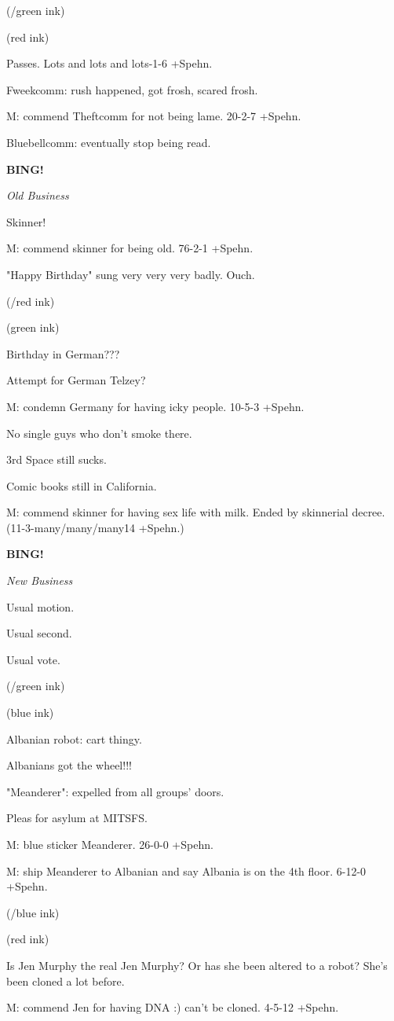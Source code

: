 \documentclass[12pt]{article}
\newcommand{\bing}{{\bf BING!} }
\newcommand{\goto}[1]{\bing \vskip 12pt \centerline{{\em{#1}}}}
\begin{document}
(/green ink)

(red ink)

Passes. Lots and lots and lots-1-6 +Spehn.

Fweekcomm: rush happened, got frosh, scared frosh.

M: commend Theftcomm for not being lame. 20-2-7 +Spehn.

Bluebellcomm: eventually stop being read.

\goto{Old Business}

Skinner!

M: commend skinner for being old. 76-2-1 +Spehn.

"Happy Birthday" sung very very very badly. Ouch.

(/red ink)

(green ink)

Birthday in German???

Attempt for German Telzey?

M: condemn Germany for having icky people. 10-5-3 +Spehn.

No single guys who don't smoke there.

3rd Space still sucks.

Comic books still in California.

M: commend skinner for having sex life with milk. Ended by skinnerial decree. (11-3-many/many/many14 +Spehn.)

\goto{New Business}

Usual motion.

Usual second.

Usual vote.

(/green ink)

(blue ink)

Albanian robot: cart thingy.

Albanians got the wheel!!!

"Meanderer": expelled from all groups' doors.

Pleas for asylum at MITSFS.

M: blue sticker Meanderer. 26-0-0 +Spehn.

M: ship Meanderer to Albanian and say Albania is on the 4th floor. 6-12-0 +Spehn.

(/blue ink)

(red ink)

Is Jen Murphy the real Jen Murphy? Or has she been altered to a robot? She's been cloned a lot before.

M: commend Jen for having DNA :) can't be cloned. 4-5-12 +Spehn.
\end{document}
